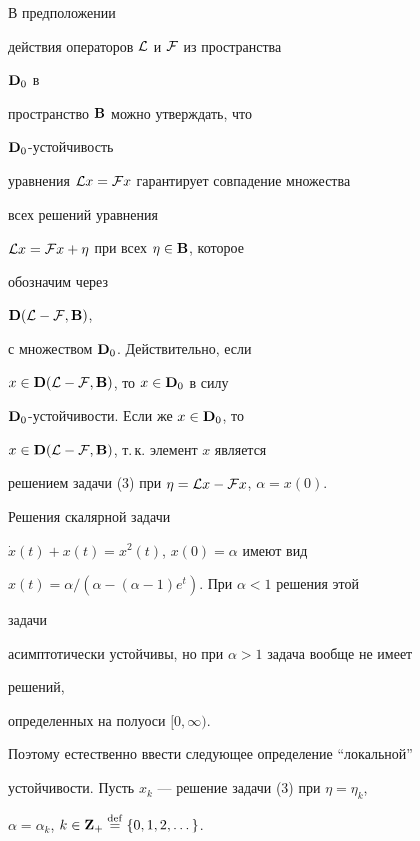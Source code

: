 \begin{note}


В предположении


действия операторов $\cal L$ и $\cal F$ из пространства


$\bold {D}_0$ в


пространство $\bold {B}$ можно утверждать, что


$\bold {D}_0$-устойчивость


уравнения ${\cal L}x={\cal F}x$ гарантирует совпадение множества


всех решений уравнения


${\cal L}x={\cal F}x+\eta$ при всех $\eta\in\bold {B}$, которое


обозначим через


$\bold {D}({\cal L}-{\cal F},\bold {B})$,


с множеством $\bold {D}_0$. Действительно, если


$x\in\bold {D}({\cal L}-{\cal F},\bold {B})$, то $x\in\bold {D}_0$ в силу


$\bold {D}_0$-устойчивости. Если же $x\in\bold {D}_0$, то


$x\in\bold {D}({\cal L}-{\cal F},\bold {B})$, т.\,к. элемент $x$ является


решением задачи (3) при $\eta={\cal L}x-{\cal F}x$, $\alpha=x(0)$.


\end{note}





Решения скалярной задачи


$\Dot x(t)+x(t)=x^2(t)$, $x(0)=\alpha$ имеют вид


$x(t)=\alpha/(\alpha-(\alpha-1)e^t)$. При $\alpha<1$ решения этой


задачи


асимптотически устойчивы, но при $\alpha>1$ задача вообще не имеет


решений,


определенных на полуоси $[0,\infty)$.


Поэтому естественно ввести следующее определение ``локальной''


устойчивости. Пусть $x_k$ --- решение задачи (3) при $\eta=\eta_k$,


$\alpha=\alpha_k$, $k\in\bold {Z}_+\overset{\mathrm{def}}{=}{}\{0,1,2,\dotsc\}$.





